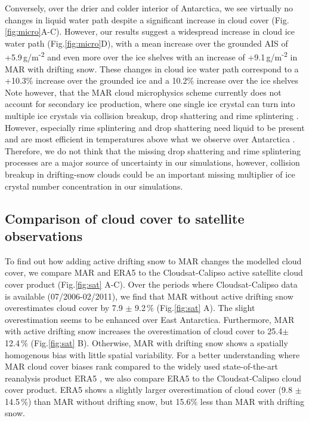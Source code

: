 \documentclass[draft]{agujournal2019}
\begin{document}
 Conversely, over the drier and colder interior of Antarctica, we see virtually no changes in liquid water path despite a significant increase in cloud cover (Fig.\ref{fig:micro}A-C). However, our results suggest a widespread increase in cloud ice water path (Fig.\ref{fig:micro}D), with a mean increase over the grounded AIS of +5.9\,g/m\textsuperscript{-2} and even more over the ice shelves with an increase of +9.1\,g/m\textsuperscript{-2} in MAR with drifting snow. These changes in cloud ice water path correspond to a +10.3\% increase over the grounded ice and a 10.2\% increase over the ice shelves  %
 Note however, that the MAR cloud microphysics scheme currently does not account for secondary ice production, where one single ice crystal can turn into multiple ice crystals via collision breakup, drop shattering and rime splintering \cite{Gallee1994, Storelvmo2015, Soti2020, Field2017}. However, especially rime splintering and drop shattering need liquid to be present and are most efficient in temperatures above what we observe over Antarctica \cite{Soti2020}. Therefore, we do not think that the missing drop shattering and rime splintering processes are a major source of uncertainty in our simulations, however, collision breakup in drifting-snow clouds could be an important missing multiplier of ice crystal number concentration in our simulations.

\subsection{Comparison of cloud cover to satellite observations}


To find out how adding active drifting snow to MAR changes the modelled cloud cover, we compare MAR and ERA5 to the Cloudsat-Calipso active satellite cloud cover product \cite{kay2009, marchand2008, mace2009} (Fig.\ref{fig:sat} A-C). Over the periods where Cloudsat-Calipso data is available (07/2006-02/2011), we find that MAR without active drifting snow overestimates cloud cover by 7.9 $\pm$ 9.2\,\% (Fig.\ref{fig:sat} A). The slight overestimation seems to be enhanced over East Antarctica. Furthermore, MAR with active drifting snow increases the overestimation of cloud cover to 25.4$\pm$ 12.4\,\% (Fig.\ref{fig:sat} B). Otherwise, MAR with drifting snow shows a spatially homogenous bias with little spatial variability. For a better understanding where MAR cloud cover biases rank compared to the widely used state-of-the-art reanalysis product ERA5 \cite{Hersbach2020}, we also compare ERA5 to the Cloudsat-Calipso cloud cover product. ERA5 shows a slightly larger overestimation of cloud cover (9.8 $\pm$ 14.5\,\%) than MAR without drifting snow, but 15.6\% less than MAR with drifting snow.
\end{document}
